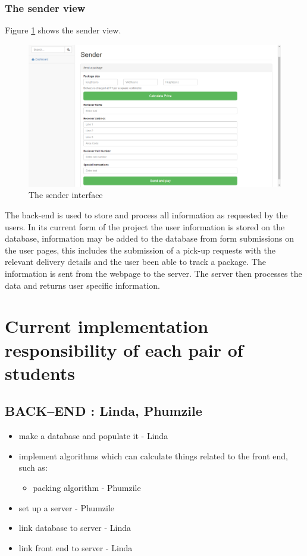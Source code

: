 \documentclass[paper=a4, fontsize=11pt]{scrartcl} %
\numberwithin{equation}{section} %
\numberwithin{figure}{section} %
\numberwithin{table}{section} %
\begin{document}
\subsubsection{The sender view}
Figure \ref{Sender} shows the sender view. 
\begin{figure}[hbt!]
\centering
\includegraphics[width=5in]{screenshots/sender.png}
\caption{The sender interface}
\label{Sender}
\end{figure}

\break

The back-end is used to store and process all information as requested by the users. In its current form of the project the user information is stored on the database, information may be added to the database from form submissions on the user pages, this includes the submission of a pick-up requests with the relevant delivery details and the user been able to track a package. The information is sent from the webpage to the server. The server then processes the data and returns user specific information.


\section{Current implementation responsibility of each pair of students}

\subsection{	BACK--END : Linda, Phumzile}


\begin{itemize}
	\item  make a database and populate it - Linda
	\item  implement algorithms which can calculate things related to the front end, such as:
		\begin{itemize}
		\item packing algorithm - Phumzile
		\end{itemize}
	\item set up a server		- Phumzile
	\item link database to server	- Linda
	\item	link front end to server - Linda

\end{itemize}
\end{document}
